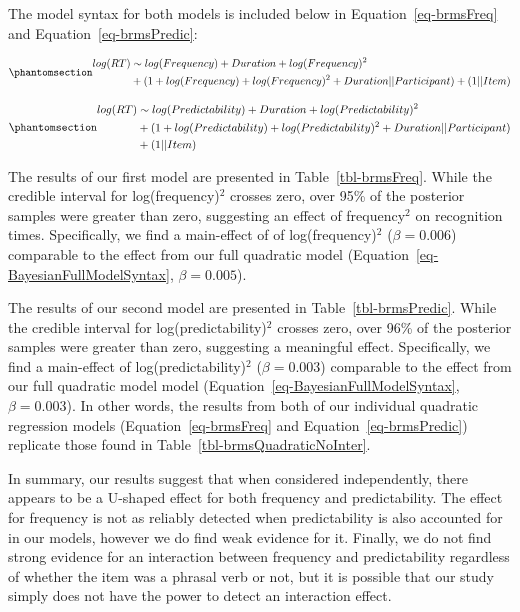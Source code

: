 \documentclass[
  12pt,
  letterpaper,
]{scrreport}
\begin{document}
The model syntax for both models is included below in
Equation~\ref{eq-brmsFreq} and Equation~\ref{eq-brmsPredic}:

\begin{equation}\phantomsection\label{eq-brmsFreq}{
\begin{aligned}
log(RT) & \sim log(Frequency) + Duration + log(Frequency)^2 \\ & + (1 + log(Frequency) + log(Frequency)^2 + Duration || Participant) + (1 || Item)
\end{aligned}
}\end{equation}

\begin{equation}\phantomsection\label{eq-brmsPredic}{
\begin{aligned}
log(RT) & \sim log(Predictability) + Duration + log(Predictability)^2 \\ & + (1 + log(Predictability) + log(Predictability)^2 + Duration || Participant) \\ & + (1 || Item)
\end{aligned}
}\end{equation}

The results of our first model are presented in
Table~\ref{tbl-brmsFreq}. While the credible interval for
log(frequency)\(^2\) crosses zero, over 95\% of the posterior samples
were greater than zero, suggesting an effect of frequency\(^2\) on
recognition times. Specifically, we find a main-effect of of
log(frequency)\(^2\) (\(\beta = 0.006\)) comparable to the effect from
our full quadratic model (Equation~\ref{eq-BayesianFullModelSyntax},
\(\beta = 0.005\)).

The results of our second model are presented in
Table~\ref{tbl-brmsPredic}. While the credible interval for
log(predictability)\(^2\) crosses zero, over 96\% of the posterior
samples were greater than zero, suggesting a meaningful effect.
Specifically, we find a main-effect of log(predictability)\(^2\)
(\(\beta=0.003\)) comparable to the effect from our full quadratic model
model (Equation~\ref{eq-BayesianFullModelSyntax}, \(\beta=0.003\)). In
other words, the results from both of our individual quadratic
regression models (Equation~\ref{eq-brmsFreq} and
Equation~\ref{eq-brmsPredic}) replicate those found in
Table~\ref{tbl-brmsQuadraticNoInter}.

In summary, our results suggest that when considered independently,
there appears to be a U-shaped effect for both frequency and
predictability. The effect for frequency is not as reliably detected
when predictability is also accounted for in our models, however we do
find weak evidence for it. Finally, we do not find strong evidence for
an interaction between frequency and predictability regardless of
whether the item was a phrasal verb or not, but it is possible that our
study simply does not have the power to detect an interaction effect.
\end{document}
